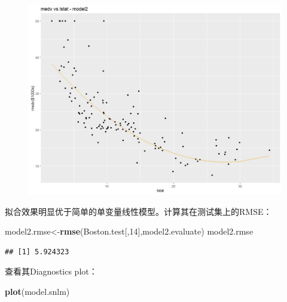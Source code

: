\documentclass[UTF-8]{ctexart}
\newenvironment{Shaded}{\begin{snugshade}}{\end{snugshade}}
\newcommand{\DecValTok}[1]{\textcolor[rgb]{0.00,0.00,0.81}{#1}}
\newcommand{\KeywordTok}[1]{\textcolor[rgb]{0.13,0.29,0.53}{\textbf{#1}}}
\newcommand{\NormalTok}[1]{#1}
\begin{document}
\begin{figure}[H]
	\centering
	\includegraphics[width=0.7\linewidth]{model2}
	\label{bdc1}
\end{figure}

拟合效果明显优于简单的单变量线性模型。计算其在测试集上的RMSE：

\begin{Shaded}
	\begin{Highlighting}[]
\NormalTok{model2.rmse<-}\KeywordTok{rmse}\NormalTok{(Boston.test[,}\DecValTok{14}\NormalTok{],model2.evaluate)}
\NormalTok{model2.rmse}
	\end{Highlighting}
\end{Shaded}

\begin{verbatim}
## [1] 5.924323
\end{verbatim}

查看其Diagnostics plot：

\begin{Shaded}
	\begin{Highlighting}[]
\KeywordTok{plot}\NormalTok{(model.snlm)}
	\end{Highlighting}
\end{Shaded}
\end{document}
